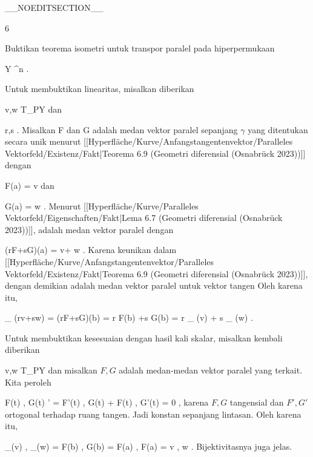 __NOEDITSECTION__

{6}

{

Buktikan teorema isometri untuk transpor paralel pada hiperpermukaan

\mavergleichskette
{\vergleichskette
{ Y
}
{ \subseteq }{ \R^n
}
{  }{
}
{    }{
}
{   }{
}
}
{}{}{.}

}
{

Untuk membuktikan linearitas, misalkan diberikan

\mavergleichskette
{\vergleichskette
{ v,w
}
{ \in }{ T_PY
}
{  }{
}
{    }{
}
{   }{
}
}
{}{}{}
dan

\mavergleichskette
{\vergleichskette
{ r,s
}
{ \in }{ \R
}
{  }{
}
{    }{
}
{   }{
}
}
{}{}{}.
Misalkan
\mathkor {} {F} {dan} {G} {}
adalah medan vektor paralel sepanjang $\gamma$ yang ditentukan secara unik menurut
[[Hyperfläche/Kurve/Anfangstangentenvektor/Paralleles Vektorfeld/Existenz/Fakt|Teorema 6.9 (Geometri diferensial (Osnabrück 2023))]]
dengan

\mavergleichskette
{\vergleichskette
{ F(a)
}
{ = }{ v
}
{  }{
}
{    }{
}
{   }{
}
}
{}{}{}
dan

\mavergleichskette
{\vergleichskette
{ G(a)
}
{ = }{ w
}
{  }{
}
{    }{
}
{   }{
}
}
{}{}{.}
Menurut
[[Hyperfläche/Kurve/Paralleles Vektorfeld/Eigenschaften/Fakt|Lema 6.7 (Geometri diferensial (Osnabrück 2023))]],
 adalah medan vektor paralel dengan

\mavergleichskette
{\vergleichskette
{ (rF+sG)(a)
}
{ = }{ v+ w
}
{  }{
}
{    }{
}
{   }{
}
}
{}{}{.}
Karena keunikan dalam
[[Hyperfläche/Kurve/Anfangstangentenvektor/Paralleles Vektorfeld/Existenz/Fakt|Teorema 6.9 (Geometri diferensial (Osnabrück 2023))]],
 dengan demikian adalah medan vektor paralel untuk vektor tangen
 Oleh karena itu,

\mavergleichskettedisp
{\vergleichskette
{ \Psi_{\gamma} (rv+sw)
}
{ =} { (rF+sG)(b)
}
{ =} { r F(b) +s G(b)
}
{ =} { r \Psi_{\gamma} (v) + s \Psi_{\gamma} (w)
}
{ } {
}
}
{}{}{.}

Untuk membuktikan kesesuaian dengan hasil kali skalar, misalkan kembali diberikan

\mavergleichskette
{\vergleichskette
{ v,w
}
{ \in }{ T_PY
}
{  }{
}
{    }{
}
{   }{
}
}
{}{}{}
dan misalkan $F,G$ adalah medan-medan vektor paralel yang terkait. Kita peroleh

\mavergleichskettedisp
{\vergleichskette
{ \left\langle  F(t) , G(t)  \right\rangle'
}
{ =} { \left\langle  F'(t) , G(t)  \right\rangle  +  \left\langle  F(t) , G'(t)  \right\rangle
}
{ =} { 0
}
{ } {
}
{ } {
}
}
{}{}{,}
karena $F,G$ tangensial dan $F',G'$ ortogonal terhadap ruang tangen. Jadi
 konstan sepanjang lintasan. Oleh karena itu,

\mavergleichskettedisp
{\vergleichskette
{ \left\langle \Psi_\gamma(v)  , \Psi_\gamma(w)  \right\rangle
}
{ =} { \left\langle  F(b)  ,  G(b)   \right\rangle
}
{ =} { \left\langle  F(a)  ,  F(a)   \right\rangle
}
{ =} { \left\langle  v  , w  \right\rangle
}
{ } {
}
}
{}{}{.}
Bijektivitasnya juga jelas.

 }

